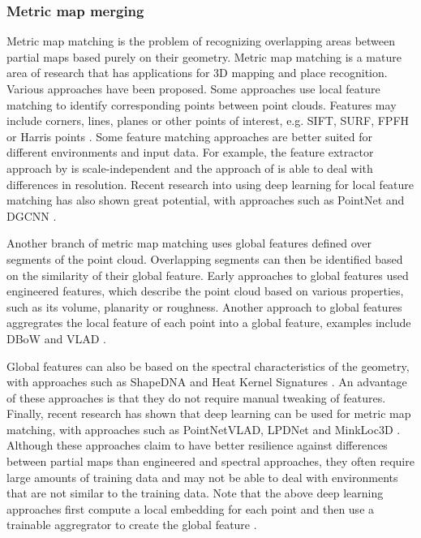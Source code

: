 \subsubsection{Metric map merging}
Metric map matching is the problem of recognizing overlapping areas between partial maps based purely on their geometry. Metric map matching is a mature area of research that has applications for 3D mapping and place recognition.  Various approaches have been proposed.  Some approaches use local feature matching to identify corresponding points between point clouds. Features may include corners, lines, planes or other points of interest, e.g. SIFT, SURF, FPFH or Harris points \citep{andersone_heterogeneous_2019,rusu_fast_2009}. Some feature matching approaches are better suited for different environments and input data. For example, the feature extractor approach by \citet{li_general_2010} is scale-independent and the approach of \citet{yang_fast_2016} is able to deal with differences in resolution. Recent research into using deep learning for local feature matching has also shown great potential, with approaches such as PointNet and DGCNN \citep{qi_pointnet_2017,phan_dgcnn_2018}.

Another branch of metric map matching uses global features defined over segments of the point cloud. Overlapping segments can then be identified based on the similarity of their global feature. Early approaches to global features used engineered features, which describe the point cloud based on various properties, such as its volume, planarity or roughness. Another approach to global features aggregrates the local feature of each point into a global feature, examples include DBoW and VLAD \citep{shan_robust_2021,arandjelovic_all_2013}.

Global features can also be based on the spectral characteristics of the geometry, with approaches such as ShapeDNA and Heat Kernel Signatures \citep{reuter_laplacebeltrami_2006,bronstein_scale-invariant_2010}. An advantage of these approaches is that they do not require manual tweaking of features. Finally, recent research has shown that deep learning can be used for metric map matching, with approaches such as PointNetVLAD, LPDNet and MinkLoc3D \citep{uy_pointnetvlad_2018-1,liu_lpd-net_2019,komorowski_minkloc3d_2021}. Although these approaches claim to have better resilience against differences between partial maps than engineered and spectral approaches, they often require large amounts of training data and may not be able to deal with environments that are not similar to the training data. Note that the above deep learning approaches first compute a local embedding for each point and then use a trainable aggregrator to create the global feature \citep{arandjelovic_netvlad_2016}. 


